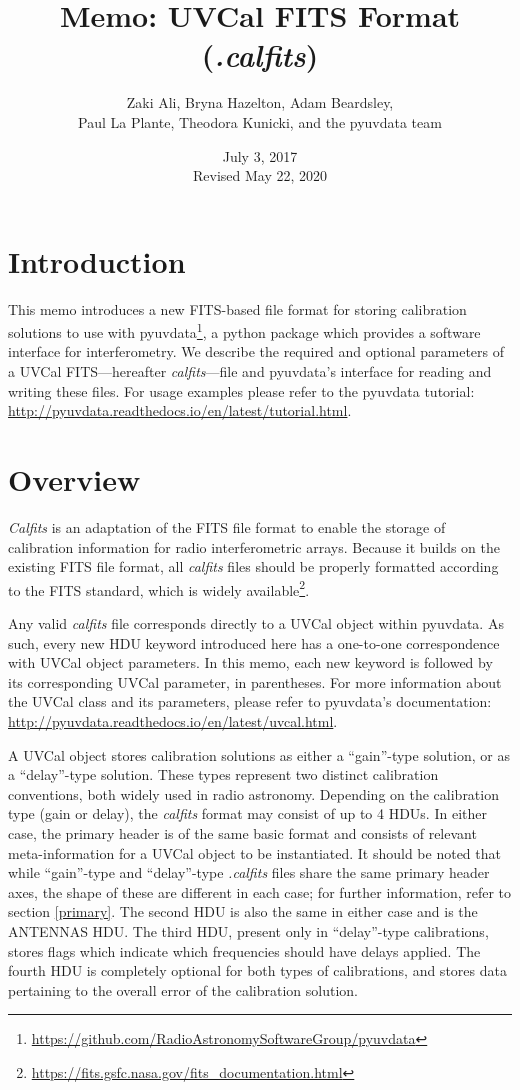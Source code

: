 \documentclass[11pt, oneside, english]{article}   	%
\title{Memo: UVCal FITS Format (\emph{.calfits})}
\author{Zaki Ali, Bryna Hazelton, Adam Beardsley,\\
	    Paul La Plante, Theodora Kunicki, and the pyuvdata team}
\date{July 3, 2017\\
 Revised May 22, 2020} %
\begin{document}
\maketitle
\section{Introduction}
This memo introduces a new FITS-based file format for storing calibration solutions to use with pyuvdata\footnote{\url{https://github.com/RadioAstronomySoftwareGroup/pyuvdata}}, a python package which
provides a software interface for interferometry.
We describe the required and optional parameters of a UVCal FITS---hereafter \textit{calfits}---file and pyuvdata's interface for reading and writing these files. 
For usage examples please refer to the pyuvdata tutorial: \url{http://pyuvdata.readthedocs.io/en/latest/tutorial.html}.

\section{Overview}
\textit{Calfits} is an adaptation of the FITS file format to enable the storage of calibration information for radio interferometric arrays.
Because it builds on the existing FITS file format, all \emph{calfits} files should be properly formatted according to the FITS standard, which is widely available\footnote{\url{https://fits.gsfc.nasa.gov/fits_documentation.html}}.


Any valid \textit{calfits} file corresponds directly to a UVCal object within pyuvdata.
As such, every new HDU keyword introduced here has a one-to-one correspondence with UVCal object parameters.
In this memo, each new keyword is followed by its corresponding UVCal parameter, in parentheses. 
For more information about the UVCal class and its parameters, please refer to pyuvdata's documentation: \url{http://pyuvdata.readthedocs.io/en/latest/uvcal.html}.

A UVCal object stores calibration solutions as either a ``gain''-type solution, or as a ``delay''-type solution.
These types represent two distinct calibration conventions, both widely used in radio astronomy.
Depending on the calibration type (gain or delay), the \textit{calfits} format may consist of up to 4 HDUs. 
In either case, the primary header is of the same basic format and consists of relevant meta-information for a UVCal object to be instantiated.
It should be noted that while ``gain''-type and ``delay''-type \emph{.calfits} files share the same primary header axes, the shape of these are different in each case; for further information, refer to section \ref{primary}.
The second HDU is also the same in either case and is the ANTENNAS HDU. 
The third HDU, present only in ``delay''-type calibrations, stores flags which indicate which frequencies should have delays applied.
The fourth HDU is completely optional for both types of calibrations, and stores data pertaining to the overall error of the calibration solution.
\end{document}
